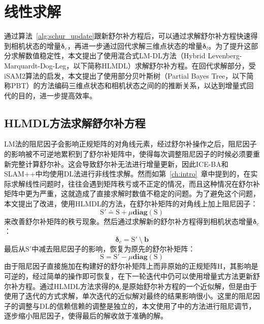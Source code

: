 \section{线性求解}

通过算法~\ref{alg:schur_update}跟新舒尔补方程后，可以通过求解舒尔补方程快速得到相机状态的增量$\bm{\delta}_c$，再进一步通过回代求解三维点状态的增量$\bm{\delta}_l$。为了提升这部分求解数值稳定性，本文提出了使用混合式LM-DL方法（Hybrid Levenberg-Marquardt-Dog-Leg，以下简称HLMDL）求解舒尔补方程。在回代求解部分，受iSAM2\citep{kaess2012isam2}算法的启发，本文提出了使用部分贝叶斯树（Partial Bayes Tree，以下简称PBT）的方法编码三维点状态和相机状态之间的的推断关系，以达到增量式回代的目的，进一步提高效率。

\subsection{HLMDL方法求解舒尔补方程}

LM法的阻尼因子会影响正规矩阵的对角线元素，经过舒尔补操作之后，阻尼因子的影响被不可逆地累积到了舒尔补矩阵中，使得每次调整阻尼因子的时候必须要重新完整计算舒尔补。这会导致舒尔补无法进行增量更新，因此ICE-BA\citep{liu2018ice}和SLAM++中均使用DL法进行非线性求解。然而如第~\ref{ch:intro}~章中提到的，在实际求解线性问题时，往往会遇到矩阵秩亏或不正定的情况，而且这种情况在舒尔补矩阵中更为严重，这就造成了直接求解时数值不稳定的问题。为了避免这个问题，本文提出了改进，使用HLMDL的方法，在舒尔补矩阵的对角线上加上阻尼因子：
\begin{equation}
    \mathrm{S}' \doteq \mathrm{S}+\mu\mathbf{diag}(\mathrm{S})
\end{equation}
来改善舒尔补矩阵的秩亏现象。然后通过求解新的舒尔补方程得到相机状态增量$\bm{\delta}_c$：
\begin{equation}
    \bm{\delta}_c = \mathrm{S}' \:\setminus\: \bm{b}
    \label{eq:hlmdl}
\end{equation}
最后从$\mathrm{S}'$中减去阻尼因子的影响，恢复为原先的舒尔补矩阵：
\begin{equation}
    \mathrm{S} = \mathrm{S}'-\mu\mathbf{diag}(\mathrm{S})
\end{equation}
由于阻尼因子直接施加在构建好的舒尔补矩阵上而非原始的正规矩阵$\mathrm{H}$，其影响是可逆的，经过简单的操作即可恢复，在下一轮迭代中仍可以使用增量式方法更新舒尔补方程。通过HLMDL方法求得的$\bm{\delta}_c$是原始舒尔补方程的一个近似解，但是由于使用了迭代的方式求解，单次迭代的近似解对最终的结果影响很小。这里的阻尼因子的调整与DL的信赖信赖的调整是独立的，本文使用了\citep{tingleff2004methods}中的方法进行阻尼调节，逐步缩小阻尼因子，使得最后的解收敛于准确的解。


